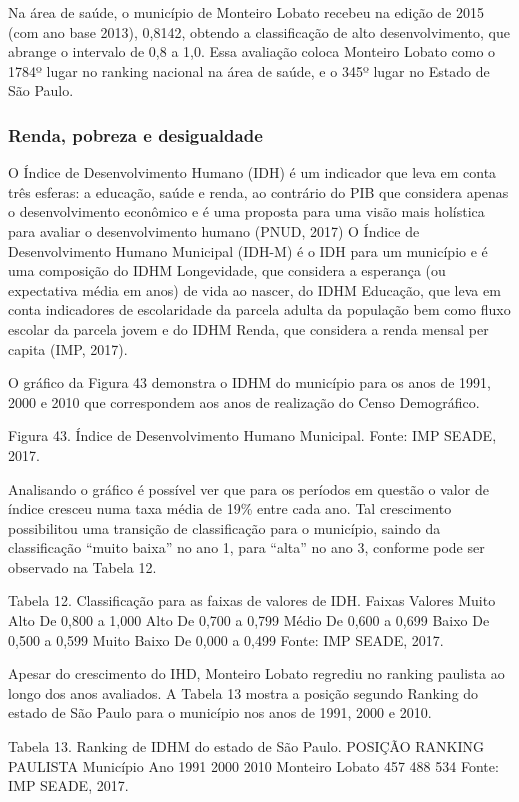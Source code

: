 Na área de saúde, o município de Monteiro Lobato recebeu na edição de 2015 (com ano base 2013), 0,8142, obtendo a classificação de alto desenvolvimento, que abrange o intervalo de 0,8 a 1,0. Essa avaliação coloca Monteiro Lobato como o 1784º lugar no ranking nacional na área de saúde, e o 345º lugar no Estado de São Paulo.

\subsubsection{Renda, pobreza e desigualdade}

O Índice de Desenvolvimento Humano (IDH) é um indicador que leva em conta três esferas: a educação, saúde e renda, ao contrário do PIB que considera apenas o desenvolvimento econômico e é uma proposta para uma visão mais holística para avaliar o desenvolvimento humano (PNUD, 2017) O Índice de Desenvolvimento Humano Municipal (IDH-M) é o IDH para um município e é uma composição do IDHM Longevidade, que considera a esperança (ou expectativa média em anos) de vida ao nascer, do IDHM Educação, que leva em conta indicadores de escolaridade da parcela adulta da população bem como fluxo escolar da parcela jovem e do IDHM Renda, que considera a renda mensal per capita (IMP, 2017).

O gráfico da Figura 43 demonstra o IDHM do município para os anos de 1991, 2000 e 2010 que correspondem aos anos de realização do Censo Demográfico.
 
Figura 43. Índice de Desenvolvimento Humano Municipal.
Fonte: IMP SEADE, 2017.

Analisando o gráfico é possível ver que para os períodos em questão o valor de índice cresceu numa taxa média de 19\% entre cada ano. Tal crescimento possibilitou uma transição de classificação para o município, saindo da classificação “muito baixa” no ano 1, para “alta” no ano 3, conforme pode ser observado na  Tabela 12.

Tabela 12. Classificação para as faixas de valores de IDH.
Faixas	Valores
Muito Alto	De 0,800 a 1,000
Alto	De 0,700 a 0,799
Médio	De 0,600 a 0,699
Baixo	De 0,500 a 0,599
Muito Baixo	De 0,000 a 0,499
Fonte: IMP SEADE, 2017.

Apesar do crescimento do IHD, Monteiro Lobato regrediu no ranking paulista ao longo dos anos avaliados. A Tabela 13 mostra a posição segundo Ranking do estado de São Paulo para o município nos anos de 1991, 2000 e 2010.

Tabela 13. Ranking de IDHM do estado de São Paulo.
POSIÇÃO RANKING PAULISTA
Município	Ano
	1991	2000	2010
Monteiro Lobato	457	488	534
Fonte: IMP SEADE, 2017.
